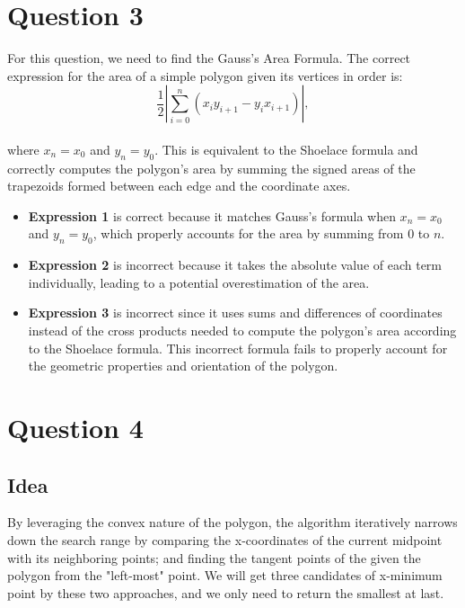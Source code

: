 \documentclass{article}
\begin{document}
\section*{Question 3}
For this question, we need to find the Gauss's Area Formula. The correct expression for the area of a simple polygon given its vertices in order is:
\\
\[ \frac{1}{2} \left| \sum_{i=0}^{n} (x_i y_{i+1} - y_i x_{i+1}) \right|, \]
\\
where \( x_n = x_0 \) and \( y_n = y_0 \). This is equivalent to the Shoelace formula and correctly computes the polygon's area by summing the signed areas of the trapezoids formed between each edge and the coordinate axes.
\\
\begin{itemize}
  \item \textbf{Expression 1} is correct because it matches Gauss's formula when \( x_n = x_0 \) and \( y_n = y_0 \), which properly accounts for the area by summing from 0 to \( n \).
  \item \textbf{Expression 2} is incorrect because it takes the absolute value of each term individually, leading to a potential overestimation of the area.
  \item \textbf{Expression 3} is incorrect since it uses sums and differences of coordinates instead of the cross products needed to compute the polygon's area according to the Shoelace formula. 
  This incorrect formula fails to properly account for the geometric properties and orientation of the polygon.
\end{itemize}

\section*{Question 4}

\subsection*{Idea}
By leveraging the convex nature of the polygon, the algorithm iteratively narrows down the search range by comparing the x-coordinates of the current midpoint with its neighboring points; and finding the tangent points of the given the polygon from the "left-most" point.
We will get three candidates of x-minimum point by these two approaches, and we only need to return the smallest at last.
\end{document}
